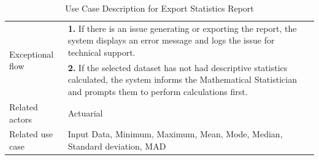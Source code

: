 \begin{table}[htb]
\begin{tabular}{|p{4cm}|p{12cm}|}
        
        \hline
        \multirow{2}{*}{Exceptional flow} 
        & \textbf{1.} If there is an issue generating or exporting the report, the system displays an error message and logs the issue for technical support. \\ 
        & \textbf{2.} If the selected dataset has not had descriptive statistics calculated, the system informs the Mathematical Statistician and prompts them to perform calculations first.   \\  \hline 
        Related actors & Actuarial \\ \hline
        Related use case & Input Data, Minimum, Maximum, Mean, Mode, Median, Standard deviation, MAD  \\ \hline
    \end{tabular}
    \caption{Use Case Description for Export Statistics Report}
    \label{tab:my_label}
   \end{table}   

